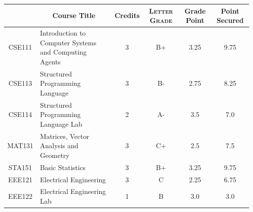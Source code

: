 \documentclass[11pt]{article}
\newcommand*{\numtwo}[1]{\pgfmathprintnumber[
                    fixed, precision=2, fixed zerofill=true]{#1}}
\begin{document}
                \begin{center}
                    \renewcommand{\arraystretch}{1.08}
                    
                \begin{tabular}{|c|l|c|>{\scshape}c|c|c|}
                \hline  \rule[-1ex]{0pt}{3.5ex} {\centering{\bf Course Code}} &  \multicolumn{1}{c|}{\textbf{Course Title}}  & {\bf Credits} & {\bf Letter Grade} & {\bf Grade Point} & {\bf Point Secured}  \\ 
                \hline   CSE111 &  Introduction to Computer Systems and Computing Agents		 & 3 & B+ & 3.25 & 9.75 \\ %
                \hline   CSE113 &  Structured Programming Language		 & 3 & B- & 2.75 & 8.25 \\ %
                \hline   CSE114 &  Structured Programming Language Lab		 & 2 & A- & 3.5 & 7.0 \\ %
                \hline   MAT131 &  Matrices, Vector Analysis and Geometry		 & 3 & C+ & 2.5 & 7.5 \\ %
                \hline   STA151 &  Basic Statistics		 & 3 & B+ & 3.25 & 9.75 \\ %
                \hline   EEE121 &  Electrical Engineering		 & 3 & C & 2.25 & 6.75 \\ %
                \hline   EEE122 &  Electrical Engineering Lab		 & 1 & B & 3.0 & 3.0 \\ %

\hline                %
                \end{tabular}
                \end{center}
                \renewcommand{\arraystretch}{1.03}
\end{document}
